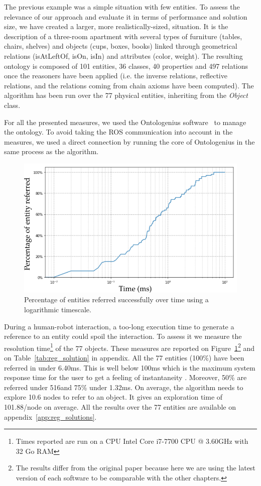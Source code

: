 The previous example was a simple situation with few entities. To assess the relevance of our approach and evaluate it in terms of performance and solution size, we have created a larger, more realistically-sized, situation. It is the description of a three-room apartment with several types of furniture (tables, chairs, shelves) and objects (cups, boxes, books) linked through geometrical relations (isAtLeftOf, isOn, isIn) and attributes (color, weight). The resulting ontology is composed of 101 entities, 36 classes, 40 properties and 497 relations once the reasoners have been applied (i.e. the inverse relations, reflective relations, and the relations coming from chain axioms have been computed). The algorithm has been run over the 77 physical entities, inheriting from the \textit{Object} class.

For all the presented measures, we used the Ontologenius software~\cite{sarthou_2019_ontologenius} to manage the ontology. To avoid taking the ROS communication into account in the measures, we used a direct connection by running the core of Ontologenius in the same process as the algorithm.

\begin{figure}[ht!]
\centering
\includegraphics[scale=0.55]{figures/chapter4/scaling_up_percentage.png}
\caption{\label{fig:chap4_percentage} Percentage of entities referred successfully over time using a logarithmic timescale. }
\end{figure}

During a human-robot interaction, a too-long execution time to generate a reference to an entity could spoil the interaction. To assess it we measure the resolution time\footnote{Times reported are run on a CPU Intel Core i7-7700 CPU @ 3.60GHz with 32 Go RAM} of the 77 objects. These measures are reported on Figure~\ref{fig:chap4_percentage}\footnote{The results differ from the original paper because here we are using the latest version of each software to be comparable with the other chapters.} and on Table~\ref{tab:reg_solution} in appendix. All the 77 entities (100\%) have been referred in under 6.40ms. This is well below 100ms which is the maximum system response time for the user to get a feeling of instantaneity \cite{miller_1968_response}. Moreover, 50\% are referred under 516\us and 75\% under 1.32ms. On average, the algorithm needs to explore 10.6 nodes to refer to an object. It gives an exploration time of 101.88\us/node on average. All the results over the 77 entities are available on appendix~\ref{app:reg_solutions}.

